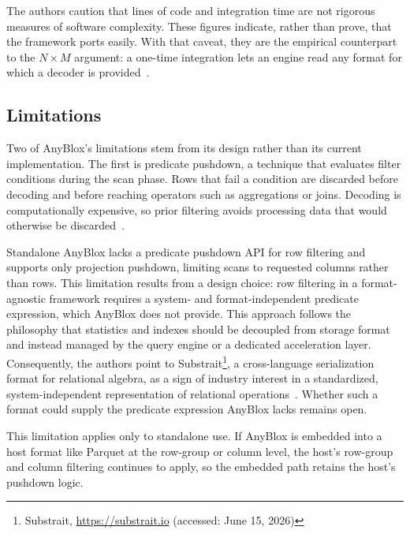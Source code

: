 The authors caution that lines of code and integration time are not rigorous measures of software complexity. These figures indicate, rather than prove, that the framework ports easily. With that caveat, they are the empirical counterpart to the $N \times M$ argument: a one-time integration lets an engine read any format for which a decoder is provided~\cite{gienieczkoAnyBloxFrameworkSelfDecoding2025}.

\subsection{Limitations}
\label{sec:limitations}

Two of AnyBlox's limitations stem from its design rather than its current implementation. The first is predicate pushdown, a technique that evaluates filter conditions during the scan phase. Rows that fail a condition are discarded before decoding and before reaching operators such as aggregations or joins. Decoding is computationally expensive, so prior filtering avoids processing data that would otherwise be discarded~\cite{silberschatzDatabaseSystemConcepts2020}.

Standalone AnyBlox lacks a predicate pushdown API for row filtering and supports only projection pushdown, limiting scans to requested columns rather than rows. This limitation results from a design choice: row filtering in a format-agnostic framework requires a system- and format-independent predicate expression, which AnyBlox does not provide. This approach follows the philosophy that statistics and indexes should be decoupled from storage format and instead managed by the query engine or a dedicated acceleration layer. Consequently, the authors point to Substrait\footnote{Substrait, \url{https://substrait.io} (accessed: June 15, 2026)}, a cross-language serialization format for relational algebra, as a sign of industry interest in a standardized, system-independent representation of relational operations~\cite{gienieczkoAnyBloxFrameworkSelfDecoding2025}. Whether such a format could supply the predicate expression AnyBlox lacks remains open.

This limitation applies only to standalone use. If AnyBlox is embedded into a host format like Parquet at the row-group or column level, the host's row-group and column filtering continues to apply, so the embedded path retains the host's pushdown logic.

